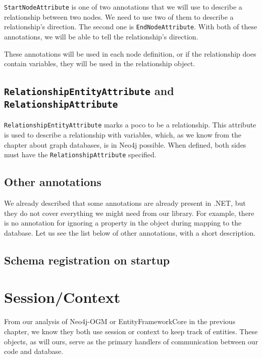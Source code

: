 \texttt{StartNodeAttribute} is one of two annotations that we will use to describe a relationship between two nodes. We need to use two of them to describe a
relationship's direction. The second one is \texttt{EndNodeAttribute}. With both of these annotations, we will be able to tell the relationship's direction.

These annotations will be used in each node definition, or if the relationship does contain variables, they will be used in the relationship object.

\subsection{\texttt{RelationshipEntityAttribute} and \texttt{RelationshipAttribute}}

\texttt{RelationshipEntityAttribute} marks a \acrshort{poco} to be a relationship. This attribute is used to describe a
relationship with variables, which, as we know from the chapter about graph databases, is in Neo4j possible. When defined,
both sides must have the \texttt{RelationshipAttribute} specified.

\subsection{Other annotations}

We already described that some annotations are already present in .NET, but they do not cover everything we might need from our library. For example, there is no annotation for ignoring a property in the object during mapping to the database. Let us see the list below of other annotations, with a short description.


\subsection{Schema registration on startup}


\section{Session/Context}

From our analysis of Neo4j-OGM or EntityFrameworkCore in the previous chapter, we know they both use session or context to keep track of entities. These objects, as will ours, serve as the primary handlers of communication between our code and database.


